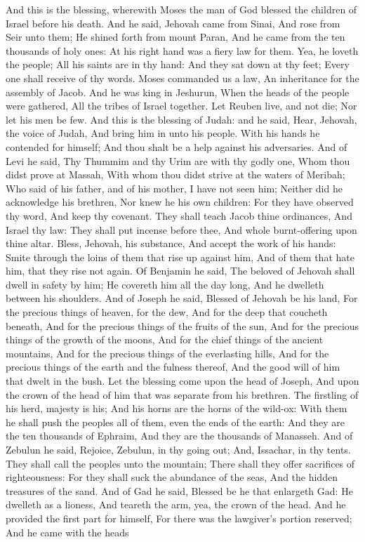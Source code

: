 And this is the blessing, wherewith Moses the man of God blessed the children of Israel before his death. And he said, Jehovah came from Sinai, And rose from Seir unto them; He shined forth from mount Paran, And he came from the ten thousands of holy ones: At his right hand was a fiery law for them.  Yea, he loveth the people; All his saints are in thy hand: And they sat down at thy feet; Every one shall receive of thy words.  Moses commanded us a law, An inheritance for the assembly of Jacob.  And he was king in Jeshurun, When the heads of the people were gathered, All the tribes of Israel together.  Let Reuben live, and not die; Nor let his men be few.  And this is the blessing of Judah: and he said, Hear, Jehovah, the voice of Judah, And bring him in unto his people. With his hands he contended for himself; And thou shalt be a help against his adversaries.  And of Levi he said, Thy Thummim and thy Urim are with thy godly one, Whom thou didst prove at Massah, With whom thou didst strive at the waters of Meribah;  Who said of his father, and of his mother, I have not seen him; Neither did he acknowledge his brethren, Nor knew he his own children: For they have observed thy word, And keep thy covenant.  They shall teach Jacob thine ordinances, And Israel thy law: They shall put incense before thee, And whole burnt-offering upon thine altar.  Bless, Jehovah, his substance, And accept the work of his hands: Smite through the loins of them that rise up against him, And of them that hate him, that they rise not again.  Of Benjamin he said, The beloved of Jehovah shall dwell in safety by him; He covereth him all the day long, And he dwelleth between his shoulders.  And of Joseph he said, Blessed of Jehovah be his land, For the precious things of heaven, for the dew, And for the deep that coucheth beneath,  And for the precious things of the fruits of the sun, And for the precious things of the growth of the moons,  And for the chief things of the ancient mountains, And for the precious things of the everlasting hills,  And for the precious things of the earth and the fulness thereof, And the good will of him that dwelt in the bush. Let the blessing come upon the head of Joseph, And upon the crown of the head of him that was separate from his brethren.  The firstling of his herd, majesty is his; And his horns are the horns of the wild-ox: With them he shall push the peoples all of them, even the ends of the earth: And they are the ten thousands of Ephraim, And they are the thousands of Manasseh.  And of Zebulun he said, Rejoice, Zebulun, in thy going out; And, Issachar, in thy tents.  They shall call the peoples unto the mountain; There shall they offer sacrifices of righteousness: For they shall suck the abundance of the seas, And the hidden treasures of the sand.  And of Gad he said, Blessed be he that enlargeth Gad: He dwelleth as a lioness, And teareth the arm, yea, the crown of the head.  And he provided the first part for himself, For there was the lawgiver’s portion reserved; And he came with the heads 